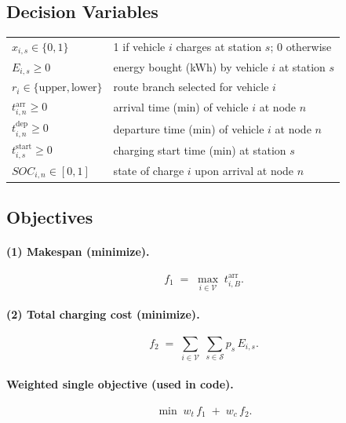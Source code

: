 \subsection{Decision Variables}
\begin{tabular}{@{}ll@{}}
$\displaystyle x_{i,s}\in\{0,1\}$ & 1 if vehicle $i$ charges at station $s$; 0 otherwise \\
$\displaystyle E_{i,s}\ge 0$ & energy bought (kWh) by vehicle $i$ at station $s$ \\
$r_i\in\{\text{upper},\text{lower}\}$ & route branch selected for vehicle $i$ \\
$t^{\text{arr}}_{i,n}\ge 0$ & arrival time (min) of vehicle $i$ at node $n$ \\
$t^{\text{dep}}_{i,n}\ge 0$ & departure time (min) of vehicle $i$ at node $n$ \\
$t^{\text{start}}_{i,s}\ge 0$ & charging start time (min) at station $s$ \\
$SOC_{i,n}\in[0,1]$ & state of charge $i$ upon arrival at node $n$ \\
\end{tabular}

\subsection{Objectives}
\paragraph{(1) Makespan (minimize).}
\begin{equation*}
f_1 \;=\; \max_{i\in\mathcal{V}} \; t^{\text{arr}}_{i,B}.
\end{equation*}

\paragraph{(2) Total charging cost (minimize).}
\begin{equation*}
f_2 \;=\; \sum_{i\in\mathcal{V}}\;\sum_{s\in\mathcal{S}} p_s \, E_{i,s}.
\end{equation*}

\paragraph{Weighted single objective (used in code).}
\begin{equation*}
\min \; w_t\, f_1 \;+\; w_c\, f_2.
\end{equation*}

